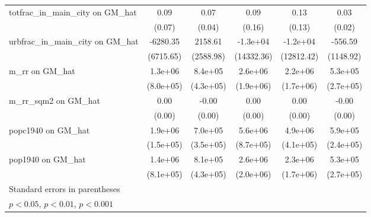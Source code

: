 \begin{table}[htbp]
\begin{tabular}{l*{5}{c}}
\addlinespace
totfrac\_in\_main\_city on GM\_hat&     0.09         &     0.07\sym{*}  &     0.09         &     0.13         &     0.03         \\
                &   (0.07)         &   (0.04)         &   (0.16)         &   (0.13)         &   (0.02)         \\
\addlinespace
urbfrac\_in\_main\_city on GM\_hat& -6280.35         &  2158.61         & -1.3e+04         & -1.2e+04         &  -556.59         \\
                &(6715.65)         &(2588.98)         &(14332.36)         &(12812.42)         &(1148.92)         \\
\addlinespace
m\_rr on GM\_hat  &  1.3e+06         &  8.4e+05\sym{*}  &  2.6e+06         &  2.2e+06         &  5.3e+05\sym{*}  \\
                &(8.0e+05)         &(4.3e+05)         &(1.9e+06)         &(1.7e+06)         &(2.7e+05)         \\
\addlinespace
m\_rr\_sqm2 on GM\_hat&     0.00         &    -0.00         &     0.00         &     0.00         &    -0.00         \\
                &   (0.00)         &   (0.00)         &   (0.00)         &   (0.00)         &   (0.00)         \\
\addlinespace
popc1940 on GM\_hat&  1.9e+06\sym{***}&  7.0e+05\sym{*}  &  5.6e+06\sym{***}&  4.9e+06\sym{***}&  5.9e+05\sym{*}  \\
                &(1.5e+05)         &(3.5e+05)         &(8.7e+05)         &(4.1e+05)         &(2.4e+05)         \\
\addlinespace
pop1940 on GM\_hat&  1.4e+06         &  8.1e+05         &  2.6e+06         &  2.3e+06         &  5.3e+05\sym{*}  \\
                &(8.1e+05)         &(4.3e+05)         &(2.0e+06)         &(1.7e+06)         &(2.7e+05)         \\
\bottomrule
\multicolumn{6}{l}{\footnotesize Standard errors in parentheses}\\
\multicolumn{6}{l}{\footnotesize \sym{*} \(p<0.05\), \sym{**} \(p<0.01\), \sym{***} \(p<0.001\)}\\
\end{tabular}
\end{table}
